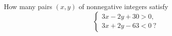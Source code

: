 How many pairs $(x,y)$ of nonnegative integers satisfy
\[\begin{cases}3x-2y+30>0,\\ 3x+2y-63<0\ ?\end{cases}\]

